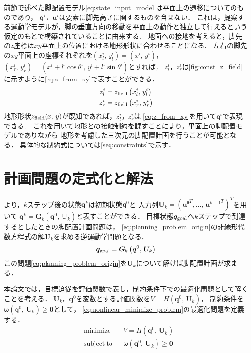 \documentclass[autodetect-engine,dvipdfmx-if-dvi,ja=standard,a4j,jbase=11pt,magstyle=nomag*]{bxjsreport}
\begin{document}
前節で述べた脚配置モデル\cref{eq:state_input_model}は平面上の遷移についてのものであり，
$\bm{q}^i$，$\bm{u}^i$は要素に脚先高さに関するものを含まない．
これは，提案する運動学モデルが，脚の垂直方向の移動を平面上の動作と独立して行えるという
仮定のもとで構築されていることに由来する．
地面への接地を考えると，脚先の$z$座標は$xy$平面上の位置における地形形状に合わせることになる．
左右の脚先の$xy$平面上の座標それぞれを$( x_l^i ,\, y_l^i ) = ( x^i ,\, y^i )$，
$( x_r^i ,\, y_r^i ) = ( x^i + l^i \cos \theta^i ,\, y^i + l^i \sin \theta^i )$とすれば，
$z_l^i$，$z_r^i$は\cref{fig:const_z_field}に示すように\cref{eq:z_from_xy}で表すことができる．
\begin{equation}
    \label{eq:z_from_xy}
    \begin{aligned}
        z_l^i & = z_{\mathrm{field}} \left( x_l^i ,\, y_l^i \right) \\
        z_r^i & = z_{\mathrm{field}} \left( x_r^i ,\, y_r^i \right)
    \end{aligned}
\end{equation}
地形形状$z_{\mathrm{field}} ( x ,\, y )$が既知であれば，$z_l^i$，$z_r^i$は
\cref{eq:z_from_xy}を用いて$\bm{q}^i$で表現できる．
これを用いて地形との接触制約を課すことにより，平面上の脚配置モデルでありながら
地形を考慮した三次元の脚配置計画を行うことが可能となる．
具体的な制約式については\cref{seq:constraints}で示す．



\section{計画問題の定式化と解法}
より，$k$ステップ後の状態$\bm{q}^k$は初期状態$\bm{q}^0$と
入力列$\bm{U}_k = ( {\bm{u}^0}^T , \dots ,\, {\bm{u}^{k - 1}}^T )^T$を用いて
$\bm{q}^k = \bm{G}_k ( \bm{q}^0 ,\, \bm{U}_k )$と表すことができる．
目標状態$\bm{q}_{\mathrm{goal}}$へ$k$ステップで到達するとしたときの脚配置計画問題は，
\cref{eq:planning_problem_origin}の非線形代数方程式の解$\bm{U}_k$を求める逆運動学問題となる．
\begin{equation} \label{eq:planning_problem_origin}
    \bm{q}_{\mathrm{goal}} = \bm{G}_k \left( \bm{q}^0 ,\, \bm{U}_k \right)
\end{equation}
この問題\cref{eq:planning_problem_origin}を$\bm{U}_k$について解けば脚配置計画が求まる．

本論文では，目標追従を評価関数で表し，制約条件下での最適化問題として解くことを考える．
$\bm{U}_k$，$\bm{q}^0$を変数とする評価関数を$V = H ( \bm{q}^0 ,\, \bm{U}_k )$，
制約条件を$\bm{\omega} ( \bm{q}^0 ,\, \bm{U}_k ) \geq \bm{0}$として，
\cref{eq:nonlinear_minimize_problem}の最適化問題を定義する．
\begin{equation} \label{eq:nonlinear_minimize_problem}
    \begin{aligned}
        & \mathrm{minimize} && V = H \left( \bm{q}^0 ,\, \bm{U}_k \right) \\
        & \mathrm{subject~to} && \bm{\omega} \left( \bm{q}^0 ,\, \bm{U}_k \right) \geq \bm{0}
    \end{aligned}
\end{equation}
\end{document}

